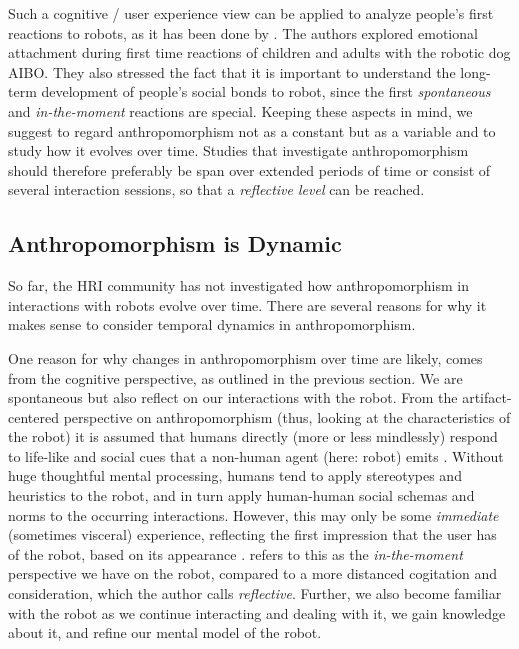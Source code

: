 \documentclass{frontiersSCNS} %
\begin{document}
Such a cognitive / user experience view can be applied to analyze people's first reactions to robots, as it has been done by \cite{weiss_i_2009}. The authors explored emotional attachment during first time reactions of children and adults with the robotic dog AIBO. They also stressed the fact that it is important to understand the long-term development of people's social bonds to robot, since the first \textit{spontaneous} and \textit{in-the-moment} reactions are special. Keeping these aspects in mind, we suggest to regard anthropomorphism not as a constant but as a variable and to study how it evolves over time. Studies that investigate anthropomorphism should therefore preferably be span over extended periods of time or consist of several interaction sessions, so that a \textit{reflective level} can be reached.

%
%
%
%
%
%

\subsection{Anthropomorphism is Dynamic}
\label{sec:dynamics}

So far, the HRI community has not investigated how anthropomorphism in interactions with robots evolve over time. There are several reasons for why it makes sense to consider temporal dynamics in anthropomorphism.

One reason for why changes in anthropomorphism over time are likely, comes from the cognitive perspective, as outlined in the previous section. We are spontaneous but also reflect on our interactions with the robot.
From the artifact-centered perspective on anthropomorphism (thus, looking at the characteristics of the robot) it is assumed that humans directly (more or less mindlessly) respond to life-like and social cues that a non-human agent (here: robot) emits \citep{reeves_media_1996,nass_machines_2000}. Without huge thoughtful mental processing, humans tend to apply stereotypes and heuristics to the robot, and in turn apply human-human social schemas and norms to the occurring interactions. However, this may only be some \textit{immediate} (sometimes visceral) experience, reflecting the first impression that the user has of the robot, based on its appearance \citep{norman_emotional_2003}. \cite{takayama_perspectives_2012} refers to this as the \textit{in-the-moment} perspective we have on the robot, compared to a more distanced cogitation and consideration, which the author calls \textit{reflective}.
Further, we also become familiar with the robot as we continue interacting and dealing with it, we gain knowledge about it, and refine our mental model of the robot.
\end{document}
